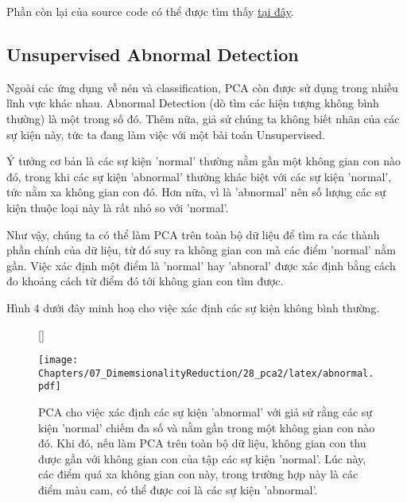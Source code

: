 Phần còn lại của source code có thể được tìm thấy \href{https://github.com/tiepvupsu/tiepvupsu.github.io/blob/master/assets/28_pca2/python/EigenFaces.ipynb}{tại đây}. 
 
 
\subsection{Unsupervised Abnormal Detection}
Ngoài các ứng dụng về nén và classification, PCA còn được sử dụng trong nhiều lĩnh vực khác nhau. Abnormal Detection (dò tìm các hiện tượng không bình thường) là một trong số đó. Thêm nữa, giả sử chúng ta không biết nhãn của các sự kiện này, tức ta đang làm việc với một bài toán Unsupervised. 
 
 Ý tưởng cơ bản là các sự kiện 'normal' thường nằm gần một không gian con nào đó, trong khi các sự kiện 'abnormal' thường khác biệt với các sự kiện 'normal', tức nằm xa không gian con đó. Hơn nữa, vì là 'abnormal' nên số lượng các sự kiện thuộc loại này là rất nhỏ so với 'normal'. 
 
Như vậy, chúng ta có thể làm PCA trên toàn bộ dữ liệu để tìm ra các thành phần chính của dữ liệu, từ đó suy ra không gian con mà các điểm 'normal' nằm gần. Việc xác định một điểm là 'normal' hay 'abnoral' được xác định bằng cách đo khoảng cách từ điểm đó tới không gian con tìm được. 
 
Hình 4 dưới đây minh hoạ cho việc xác định các sự kiện không bình thường. 
 
 

\begin{figure}[t]
    [\FBwidth]
    {\caption{ 
    PCA cho việc xác định các sự kiện 'abnormal' với giả sử rằng các sự kiện 'normal' chiếm đa số và nằm gần trong một không gian con nào đó. Khi đó, nếu làm PCA trên toàn bộ dữ liệu, không gian con thu được gần với không gian con của tập các sự kiện 'normal'. Lúc này, các điểm quá xa không gian con này, trong trường hợp này là các điểm màu cam, có thể được coi là các sự kiện 'abnormal'.
    }
    \label{fig:28_4}}
    { %
    \texttt{[image: Chapters/07\_DimemsionalityReduction/28\_pca2/latex/abnormal.pdf]}
    }
\end{figure}

